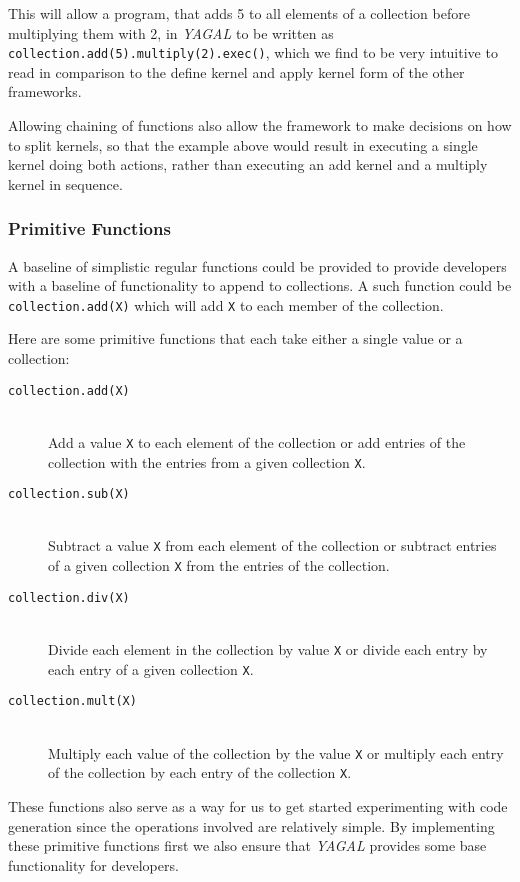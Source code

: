 This will allow a program, that adds 5 to all elements of a collection before multiplying them with 2, in \textit{YAGAL} to be written as \texttt{collection.add(5).multiply(2).exec()}, which we find to be very intuitive to read in comparison to the define kernel and apply kernel form of the other frameworks.

Allowing chaining of functions also allow the framework to make decisions on how to split kernels, so that the example above would result in executing a single kernel doing both actions, rather than executing an add kernel and a multiply kernel in sequence.

\subsubsection{Primitive Functions}
A baseline of simplistic regular functions could be provided to provide developers with a baseline of functionality to append to collections. A such function could be \texttt{collection.add(X)} which will add \texttt{X} to each member of the collection. 

Here are some primitive functions that each take either a single value or a collection: 
\begin{description}
\item[\texttt{collection.add(X)}]\hfill\\
Add a value \texttt{X} to each element of the collection or add entries of the collection with the entries from a given collection \texttt{X}.
\item[\texttt{collection.sub(X)}]\hfill\\
Subtract a value \texttt{X} from each element of the collection or subtract entries of a given collection \texttt{X} from the entries of the collection.
\item[\texttt{collection.div(X)}]\hfill\\
Divide each element in the collection by value \texttt{X} or divide each entry by each entry of a given collection \texttt{X}.
\item[\texttt{collection.mult(X)}]\hfill\\
Multiply each value of the collection by the value \texttt{X} or multiply each entry of the collection by each entry of the collection \texttt{X}.
\end{description}

These functions also serve as a way for us to get started experimenting with code generation since the operations involved are relatively simple. By implementing these primitive functions first we also ensure that \textit{YAGAL} provides some base functionality for developers.

